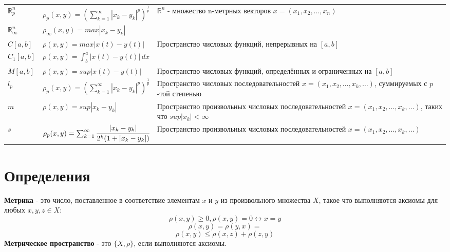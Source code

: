 \begin{tabular}{|m{2.5cm}|m{6cm}|m{7cm}|}
    $\mathbb{R}^n_p$      & $\rho_p (x,y)=(\sum_{k = 1}^{\infty}|x_k-y_k|^p)^\frac{1}{p}$            & \multirow{2}{6cm}{$\mathbb{R}^n$ - множество n-метрных векторов $x=(x_1,x_2,\dots,x_n)$  }                        \\
    \cline{1-2}
    $\mathbb{R}^n_\infty$ & $\rho_\infty (x,y)=max|x_k-y_k|$                                         &                                                                                                                   \\
    \hline
    $C[a,b]$              & $\rho (x,y)=max|x(t)-y(t)|$                                              & \multirow{2}{6cm}{Пространство числовых функций, непрерывных на $[a,b]$}                                          \\
    \cline{1-2}
    $C_1[a,b]$            & $\rho (x,y)=\int_{b}^{a}|x(t)-y(t)|\,dx $                                &                                                                                                                   \\
    \hline
    $M[a,b]$              & $\rho (x,y)=sup|x(t)-y(t)|$                                              & Пространство числовых функций, определённых и ограниченных на $[a,b]$                                             \\
    \hline
    $l_p$                 & $\rho_p (x,y)=(\sum_{k = 1}^{\infty}|x_k-y_k|^p)^\frac{1}{p}$            & Пространство числовых последовательностей $x=(x_1,x_2,\dots,x_k,\dots)$, суммируемых с $p$-той степенью           \\
    \hline
    $m$                   & $\rho (x,y)=sup|x_k-y_k|$                                                & Пространство произвольных числовых последовательностей $x=(x_1,x_2,\dots,x_k,\dots)$, таких что $sup|x_k|<\infty$ \\
    \hline
    $s$                   & $\rho_p (x,y)=\sum_{k = 1}^{\infty} \cfrac{|x_k-y_k|}{2^k(1+|x_k-y_k|)}$ & Пространство произвольных числовых последовательностей $x=(x_1,x_2,\dots,x_k,\dots)$                              \\
    \hline
\end{tabular}


\section{Определения}
\textbf{Метрика} - это число, поставленное в соответствие элементам $x$ и $y$ из произвольного множества $X$, такое что выполняются аксиомы для любых $x,y,z\in X$:
\[\rho(x,y)\geq 0,\rho(x,y)=0\longleftrightarrow x=y\]
\[\rho(x,y)=\rho(y,x)=\]
\[\rho(x,y)\leqslant \rho(x,z)+\rho(z,y)\]
\textbf{Метрическое пространство} - это $\{X,\rho\}$, если выполняются аксиомы.


